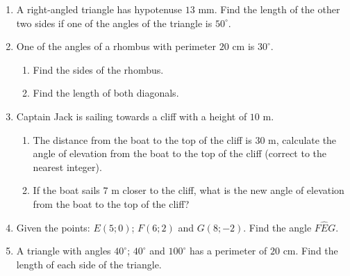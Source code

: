 \begin{eocexercises}{}
\begin{enumerate}[itemsep=6pt, label=\textbf{\arabic*}. ]
\item A right-angled triangle has hypotenuse $13$ mm. Find the length of the other two sides if one of the angles of the triangle is $50^{\circ}$.
\item One of the angles of a rhombus with perimeter $20$ cm is $30^{\circ}$. 
\begin{enumerate}[noitemsep, label=\textbf{(\alph*)} ]
\item Find the sides of the rhombus. 
\item Find the length of both diagonals. 
\end{enumerate} 
\item Captain Jack is sailing towards a cliff with a height of $10$ m. 
\begin{enumerate}[noitemsep, label=\textbf{(\alph*)} ] 
\item The distance from the boat to the top of the cliff is $30$ m, calculate the angle of elevation from the boat to the top of the cliff (correct to the nearest integer).
\item If the boat sails $7$ m closer to the cliff, what is the new angle of elevation from the boat to the top of the cliff? 
\end{enumerate} 
\item Given the points: $E(5;0)$; $F(6;2)$ and $G(8;-2)$. Find the angle $F\hat{E}G$. 
\item  A triangle with angles $40^{\circ}$; $40^{\circ}$ and $100^{\circ}$ has a perimeter of $20$ cm. Find the length of each side of the triangle. 

\end{enumerate}
\end{eocexercises}
